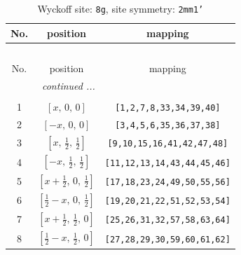 \documentclass[fleqn,8pt]{jsarticle}
\begin{document}
\begin{longtable}{ccc}
\caption{Wyckoff site: {\tt 8g}, site symmetry: {\tt 2mm1'}}
 \\
 \hline \hline
No. & position & mapping \\ \hline \endfirsthead

\multicolumn{2}{l}{\tablename\ \thetable{}} \\
 \hline \hline
No. & position & mapping \\ \hline \endhead

 \hline \hline
\multicolumn{2}{r}{\footnotesize\it continued ...} \\ \endfoot

 \hline \hline
\multicolumn{2}{r}{} \\ \endlastfoot

1 & $\left[ x,\, 0,\, 0 \right]$ & {\tt [1,2,7,8,33,34,39,40]} \\ \hline
2 & $\left[ - x,\, 0,\, 0 \right]$ & {\tt [3,4,5,6,35,36,37,38]} \\ \hline
3 & $\left[ x,\, \frac{1}{2},\, \frac{1}{2} \right]$ & {\tt [9,10,15,16,41,42,47,48]} \\ \hline
4 & $\left[ - x,\, \frac{1}{2},\, \frac{1}{2} \right]$ & {\tt [11,12,13,14,43,44,45,46]} \\ \hline
5 & $\left[ x + \frac{1}{2},\, 0,\, \frac{1}{2} \right]$ & {\tt [17,18,23,24,49,50,55,56]} \\ \hline
6 & $\left[ \frac{1}{2} - x,\, 0,\, \frac{1}{2} \right]$ & {\tt [19,20,21,22,51,52,53,54]} \\ \hline
7 & $\left[ x + \frac{1}{2},\, \frac{1}{2},\, 0 \right]$ & {\tt [25,26,31,32,57,58,63,64]} \\ \hline
8 & $\left[ \frac{1}{2} - x,\, \frac{1}{2},\, 0 \right]$ & {\tt [27,28,29,30,59,60,61,62]} \\
\end{longtable}
\renewcommand{\arraystretch}{1.2}
\end{document}
